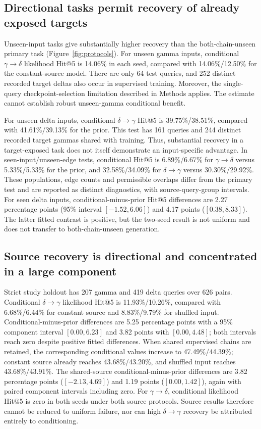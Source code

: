 \documentclass[10pt]{article}
\newcommand{\gtd}{\ensuremath{\gamma\!\rightarrow\!\delta}}
\newcommand{\dtg}{\ensuremath{\delta\!\rightarrow\!\gamma}}
\begin{document}
\subsection{Directional tasks permit recovery of already exposed targets}
Unseen-input tasks give substantially higher recovery than the both-chain-unseen
primary task (Figure~\ref{fig:protocols}). For unseen gamma inputs, conditional
\gtd{} likelihood Hit@5 is 14.06\% in each seed, compared with
14.06\%/12.50\% for the constant-source model. There are only 64 test queries,
and 252 distinct recorded target deltas also occur in supervised training.
Moreover, the single-query checkpoint-selection limitation described in Methods
applies. The estimate cannot establish robust unseen-gamma conditional benefit.

For unseen delta inputs, conditional \dtg{} Hit@5 is 39.75\%/38.51\%,
compared with 41.61\%/39.13\% for the prior. This test has 161 queries and
244 distinct recorded target gammas shared with training. Thus, substantial
recovery in a target-exposed task does not itself demonstrate an input-specific
advantage. In seen-input/unseen-edge tests, conditional Hit@5 is
6.89\%/6.67\% for \gtd{} versus 5.33\%/5.33\% for the prior, and
32.58\%/34.09\% for \dtg{} versus 30.30\%/29.92\%. These populations,
edge counts and permissible overlaps differ from the primary test and are
reported as distinct diagnostics, with source-query-group intervals.
For seen delta inputs, conditional-minus-prior Hit@5 differences are 2.27
percentage points (95\% interval $[-1.52,6.06]$) and 4.17 points
($[0.38,8.33]$). The latter fitted contrast is positive, but the two-seed
result is not uniform and does not transfer to both-chain-unseen generation.

\subsection{Source recovery is directional and concentrated in a large component}
Strict study holdout has 207 gamma and 419 delta queries over 626 pairs.
Conditional \dtg{} likelihood Hit@5 is 11.93\%/10.26\%, compared with
6.68\%/6.44\% for constant source and 8.83\%/9.79\% for shuffled input.
Conditional-minus-prior differences are 5.25 percentage points with a 95\%
component interval $[0.00,6.23]$ and 3.82 points with $[0.00,4.48]$;
both intervals reach zero despite positive fitted differences.
When shared supervised chains are retained, the corresponding conditional
values increase to 47.49\%/44.39\%; constant source already reaches
43.68\%/43.20\%, and shuffled input reaches 43.68\%/43.91\%.
The shared-source conditional-minus-prior differences are 3.82 percentage
points ($[-2.13,4.69]$) and 1.19 points ($[0.00,1.42]$), again with paired
component intervals including zero.
For \gtd{}, conditional likelihood Hit@5 is zero in both seeds under both
source protocols. Source results therefore cannot be reduced to uniform
failure, nor can high \dtg{} recovery be attributed entirely to conditioning.
\end{document}
